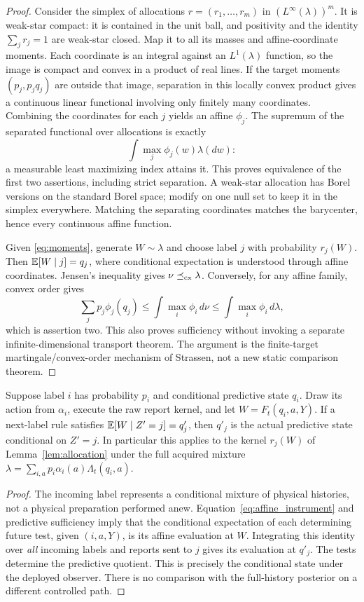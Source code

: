 \begin{proof}
Consider the simplex of allocations $r=(r_1,\ldots,r_m)$ in $(L^\infty(\lambda))^m$. It is weak-star compact: it is contained in the unit ball, and positivity and the identity $\sum_jr_j=1$ are weak-star closed. Map it to all its masses and affine-coordinate moments. Each coordinate is an integral against an $L^1(\lambda)$ function, so the image is compact and convex in a product of real lines. If the target moments $(p_j,p_jq_j)$ are outside that image, separation in this locally convex product gives a continuous linear functional involving only finitely many coordinates. Combining the coordinates for each $j$ yields an affine $\phi_j$. The supremum of the separated functional over allocations is exactly
\[
 \int\max_j\phi_j(w)\lambda(dw):
\]
a measurable least maximizing index attains it. This proves equivalence of the first two assertions, including strict separation. A weak-star allocation has Borel versions on the standard Borel space; modify on one null set to keep it in the simplex everywhere. Matching the separating coordinates matches the barycenter, hence every continuous affine function.

Given \eqref{eq:moments}, generate $W\sim\lambda$ and choose label $j$ with probability $r_j(W)$. Then $\mathbb E[W\mid j]=q_j$, where conditional expectation is understood through affine coordinates. Jensen's inequality gives $\nu\preceq_{\rm cx}\lambda$. Conversely, for any affine family, convex order gives
\[
 \sum_jp_j\phi_j(q_j)\le\int\max_i\phi_i\,d\nu
 \le\int\max_i\phi_i\,d\lambda,
\]
which is assertion two. This also proves sufficiency without invoking a separate infinite-dimensional transport theorem. The argument is the finite-target martingale/convex-order mechanism of Strassen\cite{strassen}, not a new static comparison theorem.
\end{proof}

\begin{lemma}\label{lem:calibration}
Suppose label $i$ has probability $p_i$ and conditional predictive state $q_i$. Draw its action from $\alpha_i$, execute the raw report kernel, and let $W=F_t(q_i,a,Y)$. If a next-label rule satisfies $\mathbb E[W\mid Z'=j]=q'_j$, then $q'_j$ is the actual predictive state conditional on $Z'=j$. In particular this applies to the kernel $r_j(W)$ of Lemma~\ref{lem:allocation} under the full acquired mixture $\lambda=\sum_{i,a}p_i\alpha_i(a)\Lambda_t(q_i,a)$.
\end{lemma}
\begin{proof}
The incoming label represents a conditional mixture of physical histories, not a physical preparation performed anew. Equation~\eqref{eq:affine_instrument} and predictive sufficiency imply that the conditional expectation of each determining future test, given $(i,a,Y)$, is its affine evaluation at $W$. Integrating this identity over \emph{all} incoming labels and reports sent to $j$ gives its evaluation at $q'_j$. The tests determine the predictive quotient. This is precisely the conditional state under the deployed observer. There is no comparison with the full-history posterior on a different controlled path.
\end{proof}

